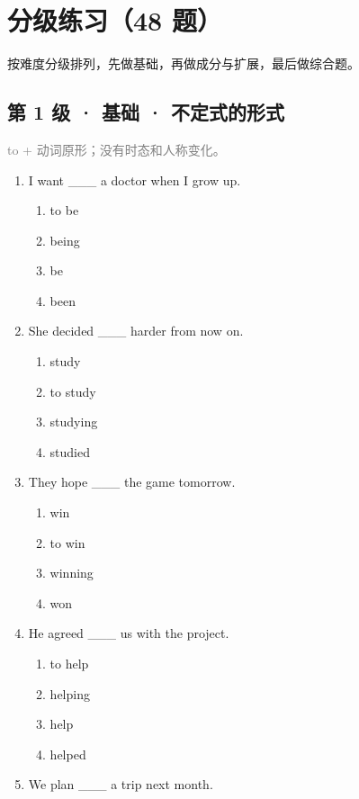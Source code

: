 \documentclass[11pt,a4paper]{ctexart}
\begin{document}
\newpage
\section{分级练习（48 题）}
\noindent 按难度分级排列，先做基础，再做成分与扩展，最后做综合题。

\subsection*{第 1 级 · 基础 · 不定式的形式}
\noindent\textcolor{gray}{to + 动词原形；没有时态和人称变化。}\par\smallskip
\begin{enumerate}[leftmargin=*,itemsep=4pt]
\item I want \_\_\_ a doctor when I grow up.
\begin{enumerate}[label=\Alph*.,leftmargin=2em,itemsep=1pt,topsep=2pt]
\item to be
\item being
\item be
\item been
\end{enumerate}
\item She decided \_\_\_ harder from now on.
\begin{enumerate}[label=\Alph*.,leftmargin=2em,itemsep=1pt,topsep=2pt]
\item study
\item to study
\item studying
\item studied
\end{enumerate}
\item They hope \_\_\_ the game tomorrow.
\begin{enumerate}[label=\Alph*.,leftmargin=2em,itemsep=1pt,topsep=2pt]
\item win
\item to win
\item winning
\item won
\end{enumerate}
\item He agreed \_\_\_ us with the project.
\begin{enumerate}[label=\Alph*.,leftmargin=2em,itemsep=1pt,topsep=2pt]
\item to help
\item helping
\item help
\item helped
\end{enumerate}
\item We plan \_\_\_ a trip next month.

\end{enumerate}
\end{document}
